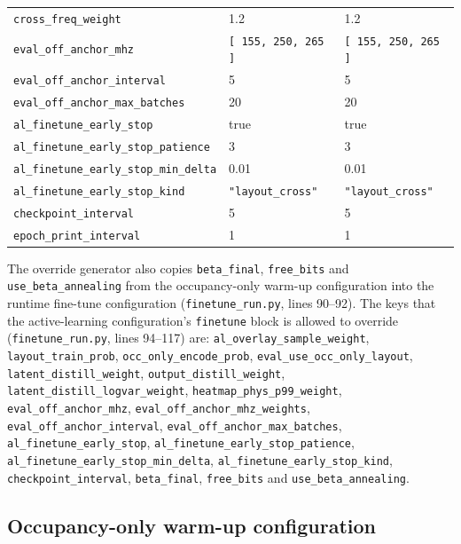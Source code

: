 \begin{table}[htbp]
\begin{tabular}{@{}lp{}p{}@{}}
\texttt{cross\_freq\_weight} & 1.2 & 1.2 \\
\texttt{eval\_off\_anchor\_mhz} & \texttt{[ 155, 250, 265 ]} & \texttt{[ 155, 250, 265 ]} \\
\texttt{eval\_off\_anchor\_interval} & 5 & 5 \\
\texttt{eval\_off\_anchor\_max\_batches} & 20 & 20 \\
\texttt{al\_finetune\_early\_stop} & true & true \\
\texttt{al\_finetune\_early\_stop\_patience} & 3 & 3 \\
\texttt{al\_finetune\_early\_stop\_min\_delta} & 0.01 & 0.01 \\
\texttt{al\_finetune\_early\_stop\_kind} & \texttt{"layout\_cross"} & \texttt{"layout\_cross"} \\
\texttt{checkpoint\_interval} & 5 & 5 \\
\texttt{epoch\_print\_interval} & 1 & 1 \\
\hline
\end{tabular}
\end{table}

The override generator also copies \texttt{beta\_final}, \texttt{free\_bits} and
\texttt{use\_beta\_annealing} from the occupancy-only warm-up configuration into the
runtime fine-tune configuration (\texttt{finetune\_run.py}, lines 90--92). The keys that
the active-learning configuration's \texttt{finetune} block is allowed to override
(\texttt{finetune\_run.py}, lines 94--117) are: \texttt{al\_overlay\_sample\_weight},
\texttt{layout\_train\_prob}, \texttt{occ\_only\_encode\_prob},
\texttt{eval\_use\_occ\_only\_layout}, \texttt{latent\_distill\_weight},
\texttt{output\_distill\_weight}, \texttt{latent\_distill\_logvar\_weight},
\texttt{heatmap\_phys\_p99\_weight}, \texttt{eval\_off\_anchor\_mhz},
\texttt{eval\_off\_anchor\_mhz\_weights}, \texttt{eval\_off\_anchor\_interval},
\texttt{eval\_off\_anchor\_max\_batches}, \texttt{al\_finetune\_early\_stop},
\texttt{al\_finetune\_early\_stop\_patience},
\texttt{al\_finetune\_early\_stop\_min\_delta},
\texttt{al\_finetune\_early\_stop\_kind}, \texttt{checkpoint\_interval},
\texttt{beta\_final}, \texttt{free\_bits} and \texttt{use\_beta\_annealing}.

\subsection{Occupancy-only warm-up configuration}
\label{subsec:appb_occ_warmup}

